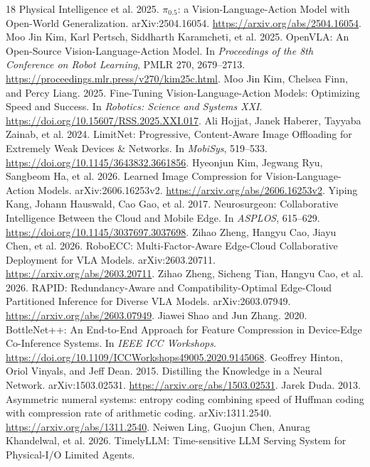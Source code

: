 \begin{thebibliography}{18}
Physical Intelligence et al. 2025.
$\pi_{0.5}$: a Vision-Language-Action Model with Open-World Generalization.
arXiv:2504.16054. \url{https://arxiv.org/abs/2504.16054}.
Moo Jin Kim, Karl Pertsch, Siddharth Karamcheti, et al. 2025.
OpenVLA: An Open-Source Vision-Language-Action Model.
In \emph{Proceedings of the 8th Conference on Robot Learning},
PMLR 270, 2679--2713.
\url{https://proceedings.mlr.press/v270/kim25c.html}.
Moo Jin Kim, Chelsea Finn, and Percy Liang. 2025.
Fine-Tuning Vision-Language-Action Models: Optimizing Speed and Success.
In \emph{Robotics: Science and Systems XXI}.
\url{https://doi.org/10.15607/RSS.2025.XXI.017}.
Ali Hojjat, Janek Haberer, Tayyaba Zainab, et al. 2024.
LimitNet: Progressive, Content-Aware Image Offloading for Extremely Weak
Devices \& Networks.
In \emph{MobiSys}, 519--533.
\url{https://doi.org/10.1145/3643832.3661856}.
Hyeonjun Kim, Jegwang Ryu, Sangbeom Ha, et al. 2026.
Learned Image Compression for Vision-Language-Action Models.
arXiv:2606.16253v2.
\url{https://arxiv.org/abs/2606.16253v2}.
Yiping Kang, Johann Hauswald, Cao Gao, et al. 2017.
Neurosurgeon: Collaborative Intelligence Between the Cloud and Mobile Edge.
In \emph{ASPLOS}, 615--629.
\url{https://doi.org/10.1145/3037697.3037698}.
Zihao Zheng, Hangyu Cao, Jiayu Chen, et al. 2026.
RoboECC: Multi-Factor-Aware Edge-Cloud Collaborative Deployment for VLA Models.
arXiv:2603.20711.
\url{https://arxiv.org/abs/2603.20711}.
Zihao Zheng, Sicheng Tian, Hangyu Cao, et al. 2026.
RAPID: Redundancy-Aware and Compatibility-Optimal Edge-Cloud Partitioned
Inference for Diverse VLA Models.
arXiv:2603.07949.
\url{https://arxiv.org/abs/2603.07949}.
Jiawei Shao and Jun Zhang. 2020.
BottleNet++: An End-to-End Approach for Feature Compression in
Device-Edge Co-Inference Systems.
In \emph{IEEE ICC Workshops}.
\url{https://doi.org/10.1109/ICCWorkshops49005.2020.9145068}.
Geoffrey Hinton, Oriol Vinyals, and Jeff Dean. 2015.
Distilling the Knowledge in a Neural Network.
arXiv:1503.02531.
\url{https://arxiv.org/abs/1503.02531}.
Jarek Duda. 2013.
Asymmetric numeral systems: entropy coding combining speed of Huffman
coding with compression rate of arithmetic coding.
arXiv:1311.2540.
\url{https://arxiv.org/abs/1311.2540}.
Neiwen Ling, Guojun Chen, Anurag Khandelwal, et al. 2026.
TimelyLLM: Time-sensitive LLM Serving System for Physical-I/O Limited Agents.

\end{thebibliography}
